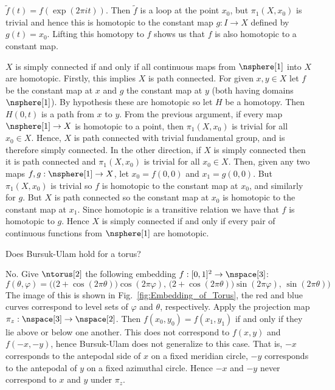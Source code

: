 \documentclass{book}                                                           %
\begin{document}
\begin{solution}
    $\tilde{f}(t)=f(\exp(2\pi{i}t))$. Then $\tilde{f}$ is a loop at the
    point $x_{0}$, but $\pi_{1}(X,x_{0})$ is trivial and hence this is
    homotopic to the constant map $g:I\rightarrow{X}$ defined by
    $g(t)=x_{0}$. Lifting this homotopy to $f$ shows us that $f$ is also
    homotopic to a constant map.
    \par\hfill\par
    $X$ is simply connected if and only if all continuous maps from
    $\nsphere[1]$ into $X$ are homotopic. Firstly, this implies $X$ is
    path connected. For given $x,y\in{X}$ let $f$ be the constant map at
    $x$ and $g$ the constant map at $y$ (both having domains $\nsphere[1]$).
    By hypothesis these are homotopic so let $H$ be a homotopy. Then
    $H(0,t)$ is a path from $x$ to $y$. From the previous argument, if every
    map $\nsphere[1]\rightarrow{X}$ is homotopic to a point, then
    $\pi_{1}(X,x_{0})$ is trivial for all $x_{0}\in{X}$. Hence, $X$ is path
    connected with trivial fundamental group, and is therefore simply
    connected. In the other direction, if $X$ is simply connected then it is
    path connected and $\pi_{1}(X,x_{0})$ is trivial for all $x_{0}\in{X}$.
    Then, given any two maps $f,g:\nsphere[1]\rightarrow{X}$, let
    $x_{0}=f(0,0)$ and $x_{1}=g(0,0)$. But $\pi_{1}(X,x_{0})$ is trivial so
    $f$ is homotopic to the constant map at $x_{0}$, and similarly for
    $g$. But $X$ is path connected so the constant map at $x_{0}$ is
    homotopic to the constant map at $x_{1}$. Since homotopic is a
    transitive relation we have that $f$ is homotopic to $g$. Hence $X$ is
    simply connected if and only if every pair of continuous functions
    from $\nsphere[1]$ are homotopic.
\end{solution}
\begin{problem}
    Does Bursuk-Ulam hold for a torus?
\end{problem}
\begin{solution}
    No. Give $\ntorus[2]$ the following embedding
    $f:[0,1]^{2}\rightarrow\nspace[3]$:
    \begin{equation}
        f(\theta,\varphi)=\Big(
            \big(2+\cos(2\pi\theta)\big)\cos(2\pi\varphi),\,
            \big(2+\cos(2\pi\theta)\big)\sin(2\pi\varphi),\,
            \sin(2\pi\theta)
        \Big)
    \end{equation}
    The image of this is shown in Fig.~\ref{fig:Embedding_of_Torus}, the
    red and blue curves correspond to level sets of
    $\varphi$ and $\theta$, respectively. Apply the projection map
    $\pi_{z}:\nspace[3]\rightarrow\nspace[2]$. Then
    $f(x_{0},y_{0})=f(x_{1},y_{1})$ if and only if they lie above or below
    one another. This does not correspond to $f(x,y)$ and
    $f(\minus{x},\minus{y})$, hence Bursuk-Ulam does not generalize to this
    case. That is, $\minus{x}$ corresponds to the antepodal side of $x$ on
    a fixed meridian circle, $\minus{y}$ corresponds to the antepodal of
    $y$ on a fixed azimuthal circle. Hence $\minus{x}$ and $\minus{y}$
    never correspond to $x$ and $y$ under $\pi_{z}$.
\end{solution}
\end{document}
